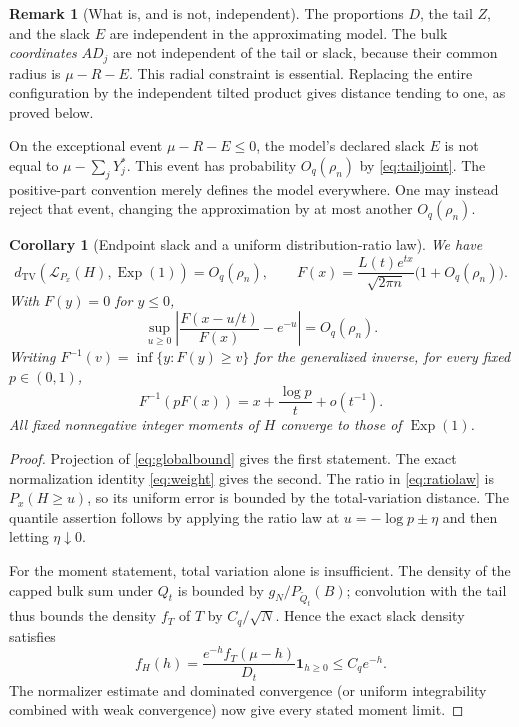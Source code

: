 \documentclass[11pt,letterpaper]{article}
\numberwithin{equation}{section}
\newtheorem{corollary}[theorem]{Corollary}
\theoremstyle{definition}
\newtheorem{remark}[theorem]{Remark}
\theoremstyle{remark}
\newcommand{\ind}{\mathbf 1}
\newcommand{\TV}{d_{\mathrm{TV}}}
\newcommand{\Law}{\mathcal L}
\newcommand{\Exp}{\operatorname{Exp}}
\begin{document}
\begin{remark}[What is, and is not, independent]
The proportions $D$, the tail $Z$, and the slack $E$ are independent in the
approximating model. The bulk \emph{coordinates} $AD_j$ are not independent of
the tail or slack, because their common radius is $\mu-R-E$. This radial
constraint is essential. Replacing the entire configuration by the independent
tilted product gives distance tending to one, as proved below.

On the exceptional event $\mu-R-E\le0$, the model's declared slack $E$ is not
equal to $\mu-\sum_jY_j^*$. This event has probability $O_q(\rho_n)$ by
\eqref{eq:tailjoint}. The positive-part convention merely defines the model
everywhere. One may instead reject that event, changing the approximation by
at most another $O_q(\rho_n)$.
\end{remark}

\begin{corollary}[Endpoint slack and a uniform distribution-ratio law]
\label{cor:slack}
We have
\begin{equation}
 \TV(\Law_{P_x}(H),\Exp(1))=O_q(\rho_n),\qquad
 F(x)=\frac{L(t)e^{tx}}{\sqrt{2\pi n}}\big(1+O_q(\rho_n)\big).
 \label{eq:slacklimit}
\end{equation}
With $F(y)=0$ for $y\le0$,
\begin{equation}
 \sup_{u\ge0}\left|\frac{F(x-u/t)}{F(x)}-e^{-u}\right|
 =O_q(\rho_n).
 \label{eq:ratiolaw}
\end{equation}
Writing $F^{-1}(v)=\inf\{y:F(y)\ge v\}$ for the generalized inverse,
for every fixed $p\in(0,1)$,
\begin{equation}
 F^{-1}(pF(x))=x+\frac{\log p}{t}+o(t^{-1}).
 \label{eq:quantile}
\end{equation}
All fixed nonnegative integer moments of $H$ converge to those of $\Exp(1)$.
\end{corollary}
\begin{proof}
Projection of \eqref{eq:globalbound} gives the first statement. The exact
normalization identity \eqref{eq:weight} gives the second. The ratio in
\eqref{eq:ratiolaw} is $P_x(H\ge u)$, so its uniform error is bounded by the
total-variation distance. The quantile assertion follows by applying the
ratio law at $u=-\log p\pm\eta$ and then letting $\eta\downarrow0$.

For the moment statement, total variation alone is insufficient. The density
of the capped bulk sum under $Q_t$ is bounded by $g_N/P_{\widetilde Q_t}(B)$;
convolution with the tail thus bounds the density $f_T$ of $T$ by
$C_q/\sqrt N$. Hence the exact slack density satisfies
\[
 f_H(h)=\frac{e^{-h}f_T(\mu-h)}{D_t}\ind_{h\ge0}
 \le C_qe^{-h}.
\]
The normalizer estimate and dominated convergence (or uniform integrability
combined with weak convergence) now give every stated moment limit.
\end{proof}
\end{document}
